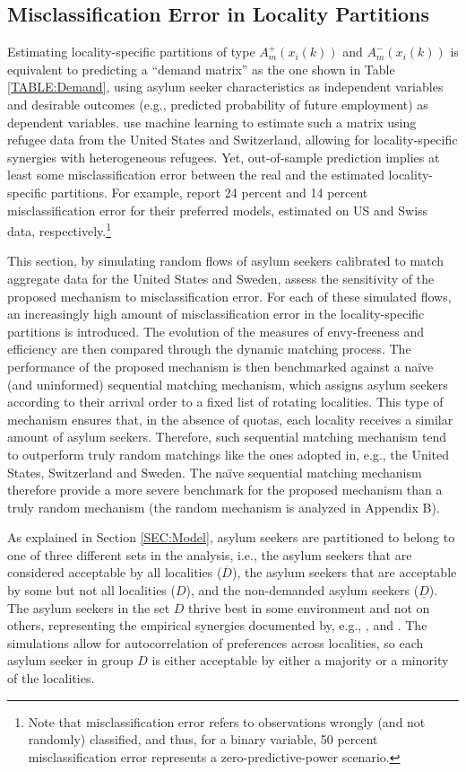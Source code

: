 \documentclass[12pt,fleqn]{article}
\begin{document}
\subsection{Misclassification Error in Locality Partitions}
Estimating locality-specific partitions of type $A^+_m(x_i(k))$ and $A^-_m(x_i(k))$ is equivalent to predicting a ``demand matrix'' as the one shown in Table \ref{TABLE:Demand}, using asylum seeker characteristics as independent variables and desirable outcomes (e.g., predicted probability of future employment) as dependent variables. \cite{bib:BansakEtAl} use machine learning to estimate such a matrix using refugee data from the United States and Switzerland, allowing for locality-specific synergies with heterogeneous refugees. Yet, out-of-sample prediction implies at least some misclassification error between the real and the estimated locality-specific partitions. For example, \cite{bib:BansakEtAl} report 24 percent and 14 percent misclassification error for their preferred models, estimated on US and Swiss data, respectively.\footnote{Note that misclassification error refers to observations wrongly (and not randomly) classified, and thus, for a binary variable, 50 percent misclassification error represents a zero-predictive-power scenario.}

This section, by simulating random flows of asylum seekers calibrated to match aggregate data for the United States and Sweden, assess the sensitivity of the proposed mechanism to misclassification error. For each of these simulated flows, an increasingly high amount of misclassification error in the locality-specific partitions is introduced. The evolution of the measures of envy-freeness and efficiency are then compared through the dynamic matching process. The performance of the proposed mechanism is then benchmarked against a na\"{i}ve (and uninformed) sequential matching mechanism, which assigns asylum seekers according to their arrival order to a fixed list of rotating localities. This type of mechanism ensures that, in the absence of quotas, each locality receives a similar amount of asylum seekers. Therefore, such sequential matching mechanism tend to outperform truly random matchings like the ones adopted in, e.g., the United States, Switzerland and Sweden. The na\"{i}ve sequential matching mechanism therefore provide a more severe benchmark for the proposed mechanism than a truly random mechanism (the random mechanism is analyzed in Appendix B).

As explained in Section \ref{SEC:Model}, asylum seekers are partitioned to belong to one of three different sets in the analysis, i.e., the asylum seekers that are considered acceptable by all localities ($\overline{D}$), the asylum seekers that are acceptable by some but not all localities ($D$), and the non-demanded asylum seekers ($\underline{D}$). The asylum seekers in the set $D$ thrive best in some environment and not on others, representing the empirical synergies documented by, e.g., \cite{bib:BansakEtAl}, \citet{bib:Damm} and \citet{bib:EdinEtAl}. The simulations allow for autocorrelation of preferences across localities, so each asylum seeker in group $D$ is either acceptable by either a majority or a minority of the localities. 
\end{document}
